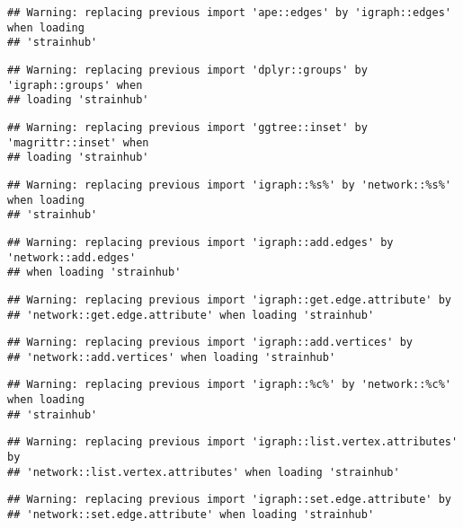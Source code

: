 \documentclass[
]{article}
\begin{document}
\begin{verbatim}
## Warning: replacing previous import 'ape::edges' by 'igraph::edges' when loading
## 'strainhub'
\end{verbatim}

\begin{verbatim}
## Warning: replacing previous import 'dplyr::groups' by 'igraph::groups' when
## loading 'strainhub'
\end{verbatim}

\begin{verbatim}
## Warning: replacing previous import 'ggtree::inset' by 'magrittr::inset' when
## loading 'strainhub'
\end{verbatim}

\begin{verbatim}
## Warning: replacing previous import 'igraph::%s%' by 'network::%s%' when loading
## 'strainhub'
\end{verbatim}

\begin{verbatim}
## Warning: replacing previous import 'igraph::add.edges' by 'network::add.edges'
## when loading 'strainhub'
\end{verbatim}

\begin{verbatim}
## Warning: replacing previous import 'igraph::get.edge.attribute' by
## 'network::get.edge.attribute' when loading 'strainhub'
\end{verbatim}

\begin{verbatim}
## Warning: replacing previous import 'igraph::add.vertices' by
## 'network::add.vertices' when loading 'strainhub'
\end{verbatim}

\begin{verbatim}
## Warning: replacing previous import 'igraph::%c%' by 'network::%c%' when loading
## 'strainhub'
\end{verbatim}

\begin{verbatim}
## Warning: replacing previous import 'igraph::list.vertex.attributes' by
## 'network::list.vertex.attributes' when loading 'strainhub'
\end{verbatim}

\begin{verbatim}
## Warning: replacing previous import 'igraph::set.edge.attribute' by
## 'network::set.edge.attribute' when loading 'strainhub'
\end{verbatim}
\end{document}
